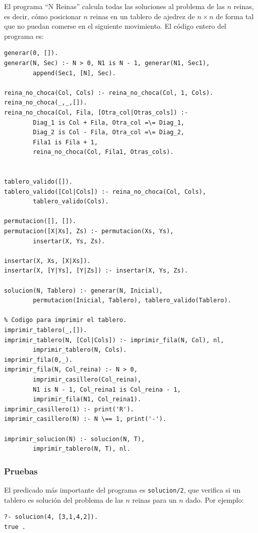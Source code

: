 \documentclass[12pt,titlepage]{article}
\begin{document}
El programa ``N Reinas'' calcula todas las soluciones al problema de las $n$ reinas\cite{nreinas}, es decir, cómo posicionar $n$ reinas en un tablero de ajedrez de $n \times n$ de forma tal que no puedan comerse en el siguiente movimiento. El código entero del programa es:
\begin{lstlisting}
generar(0, []).
generar(N, Sec) :- N > 0, N1 is N - 1, generar(N1, Sec1), 
        append(Sec1, [N], Sec).

reina_no_choca(Col, Cols) :- reina_no_choca(Col, 1, Cols).
reina_no_choca(_,_,[]).
reina_no_choca(Col, Fila, [Otra_col|Otras_cols]) :-
        Diag_1 is Col + Fila, Otra_col =\= Diag_1,
        Diag_2 is Col - Fila, Otra_col =\= Diag_2,
        Fila1 is Fila + 1,
        reina_no_choca(Col, Fila1, Otras_cols).


tablero_valido([]).
tablero_valido([Col|Cols]) :- reina_no_choca(Col, Cols), 
        tablero_valido(Cols).

permutacion([], []).
permutacion([X|Xs], Zs) :- permutacion(Xs, Ys), 
        insertar(X, Ys, Zs).

insertar(X, Xs, [X|Xs]).
insertar(X, [Y|Ys], [Y|Zs]) :- insertar(X, Ys, Zs).

solucion(N, Tablero) :- generar(N, Inicial), 
        permutacion(Inicial, Tablero), tablero_valido(Tablero).

% Codigo para imprimir el tablero.
imprimir_tablero(_,[]).
imprimir_tablero(N, [Col|Cols]) :- imprimir_fila(N, Col), nl, 
        imprimir_tablero(N, Cols).
imprimir_fila(0,_).
imprimir_fila(N, Col_reina) :- N > 0, 
        imprimir_casillero(Col_reina), 
        N1 is N - 1, Col_reina1 is Col_reina - 1, 
        imprimir_fila(N1, Col_reina1).
imprimir_casillero(1) :- print('R').
imprimir_casillero(N) :- N \== 1, print('-').

imprimir_solucion(N) :- solucion(N, T), 
        imprimir_tablero(N, T), nl.
\end{lstlisting}

\subsubsection{Pruebas}

El predicado más importante del programa es \lstinline|solucion/2|, que verifica si un tablero es solución del problema de las $n$ reinas para un $n$ dado. Por ejemplo:
\begin{lstlisting}
?- solucion(4, [3,1,4,2]).
true .
\end{lstlisting}
\end{document}
